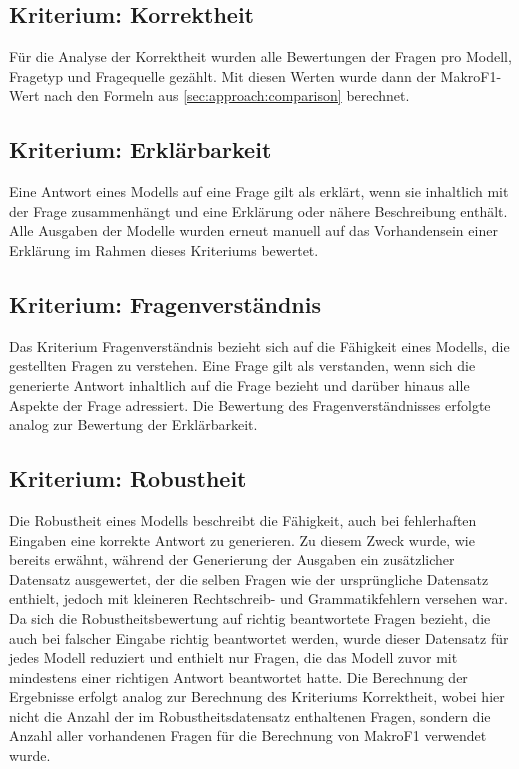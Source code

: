 \subsection{Kriterium: Korrektheit}
Für die Analyse der Korrektheit wurden alle Bewertungen der Fragen pro Modell, Fragetyp und Fragequelle gezählt.
Mit diesen Werten wurde dann der MakroF1-Wert nach den Formeln aus \cref{sec:approach:comparison} berechnet.

\subsection{Kriterium: Erklärbarkeit}
Eine Antwort eines Modells auf eine Frage gilt als erklärt, wenn sie inhaltlich mit der Frage zusammenhängt und eine Erklärung oder nähere Beschreibung enthält.
Alle Ausgaben der Modelle wurden erneut manuell auf das Vorhandensein einer Erklärung im Rahmen dieses Kriteriums bewertet.

\subsection{Kriterium: Fragenverständnis}
Das Kriterium Fragenverständnis bezieht sich auf die Fähigkeit eines Modells, die gestellten Fragen zu verstehen.
Eine Frage gilt als verstanden, wenn sich die generierte Antwort inhaltlich auf die Frage bezieht und darüber hinaus alle Aspekte der Frage adressiert.
Die Bewertung des Fragenverständnisses erfolgte analog zur Bewertung der Erklärbarkeit.

\subsection{Kriterium: Robustheit}
Die Robustheit eines Modells beschreibt die Fähigkeit, auch bei fehlerhaften Eingaben eine korrekte Antwort zu generieren.
Zu diesem Zweck wurde, wie bereits erwähnt, während der Generierung der Ausgaben ein zusätzlicher Datensatz ausgewertet, der die selben Fragen wie der ursprüngliche Datensatz enthielt, jedoch mit kleineren Rechtschreib- und Grammatikfehlern versehen war.
Da sich die Robustheitsbewertung auf richtig beantwortete Fragen bezieht, die auch bei falscher Eingabe richtig beantwortet werden, wurde dieser Datensatz für jedes Modell reduziert und enthielt nur Fragen, die das Modell zuvor mit mindestens einer richtigen Antwort beantwortet hatte.
Die Berechnung der Ergebnisse erfolgt analog zur Berechnung des Kriteriums Korrektheit, wobei hier nicht die Anzahl der im Robustheitsdatensatz enthaltenen Fragen, sondern die Anzahl aller vorhandenen Fragen für die Berechnung von MakroF1 verwendet wurde.